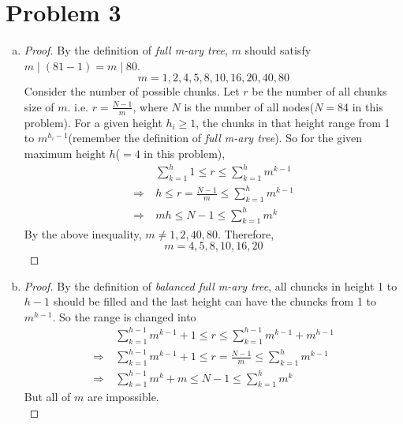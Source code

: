 \section*{Problem 3}
	\begin{enumerate} [(a)]
		\item \begin{proof}
			By the definition of \textit{full m-ary tree}, $m$ should satisfy $m \mid (81 - 1) = m \mid 80$.
			\begin{equation*}
				m = 1, 2, 4, 5, 8, 10, 16, 20, 40, 80
			\end{equation*}
			Consider the number of possible chunks. Let $r$ be the number of all chunks size of $m$. i.e. $r = \frac{N - 1}{m}$, where $N$ is the number of all nodes($N = 84$ in this problem). For a given height $h_i\geq1$, the chunks in that height range from 1 to $m^{h_i - 1}$(remember the definition of \textit{full m-ary tree}). So for the given maximum height $h$($=4$ in this problem),
			\begin{align*}
				& \sum\limits_{k=1}^h 1 \leq r \leq \sum\limits_{k=1}^h m^{k-1}\\
				\Rightarrow\ & h \leq r=\frac{N - 1}{m} \leq \sum\limits_{k=1}^h m^{k-1}\\
				\Rightarrow\ & mh \leq N - 1 \leq \sum\limits_{k=1}^h m^k
			\end{align*}
			By the above inequality, $m \neq 1, 2, 40, 80$. Therefore,
			\begin{equation*}
				m = 4, 5, 8, 10, 16, 20
			\end{equation*}
		\end{proof}
		\item \begin{proof}
			By the definition of \textit{balanced full m-ary tree}, all chuncks in height 1 to $h - 1$ should be filled and the last height can have the chuncks from 1 to $m^{h - 1}$. So the range is changed into
			\begin{align*}
				& \sum\limits_{k=1}^{h-1}m^{k-1} + 1 \leq r \leq \sum\limits_{k=1}^{h-1} m^{k-1} + m^{h-1}\\
				\Rightarrow\ & \sum\limits_{k=1}^{h-1}m^{k-1} + 1 \leq r=\frac{N - 1}{m} \leq \sum\limits_{k=1}^h m^{k-1}\\
				\Rightarrow\ & \sum\limits_{k=1}^{h-1}m^{k} + m \leq N - 1 \leq \sum\limits_{k=1}^h m^k
			\end{align*}
			But all of $m$ are impossible.\\
		\end{proof}
	\end{enumerate}